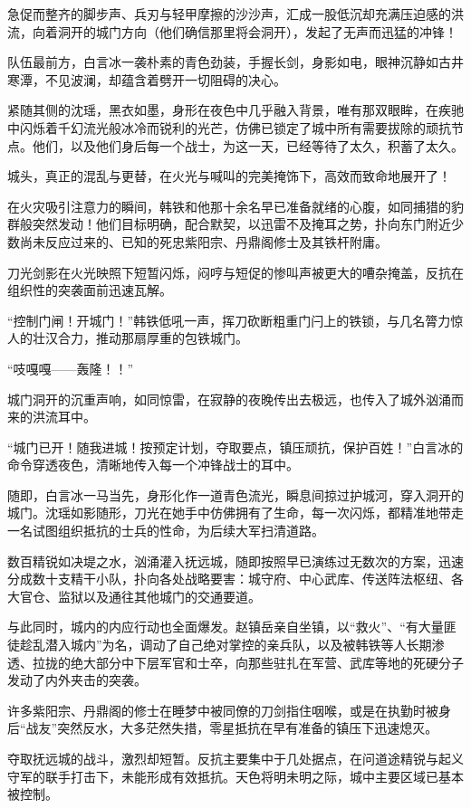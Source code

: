 急促而整齐的脚步声、兵刃与轻甲摩擦的沙沙声，汇成一股低沉却充满压迫感的洪流，向着洞开的城门方向（他们确信那里将会洞开），发起了无声而迅猛的冲锋！

队伍最前方，白言冰一袭朴素的青色劲装，手握长剑，身影如电，眼神沉静如古井寒潭，不见波澜，却蕴含着劈开一切阻碍的决心。

紧随其侧的沈瑶，黑衣如墨，身形在夜色中几乎融入背景，唯有那双眼眸，在疾驰中闪烁着千幻流光般冰冷而锐利的光芒，仿佛已锁定了城中所有需要拔除的顽抗节点。他们，以及他们身后每一个战士，为这一天，已经等待了太久，积蓄了太久。

城头，真正的混乱与更替，在火光与喊叫的完美掩饰下，高效而致命地展开了！

在火灾吸引注意力的瞬间，韩铁和他那十余名早已准备就绪的心腹，如同捕猎的豹群般突然发动！他们目标明确，配合默契，以迅雷不及掩耳之势，扑向东门附近少数尚未反应过来的、已知的死忠紫阳宗、丹鼎阁修士及其铁杆附庸。

刀光剑影在火光映照下短暂闪烁，闷哼与短促的惨叫声被更大的嘈杂掩盖，反抗在组织性的突袭面前迅速瓦解。

“控制门闸！开城门！”韩铁低吼一声，挥刀砍断粗重门闩上的铁锁，与几名膂力惊人的壮汉合力，推动那扇厚重的包铁城门。

“吱嘎嘎——轰隆！！”

城门洞开的沉重声响，如同惊雷，在寂静的夜晚传出去极远，也传入了城外汹涌而来的洪流耳中。

“城门已开！随我进城！按预定计划，夺取要点，镇压顽抗，保护百姓！”白言冰的命令穿透夜色，清晰地传入每一个冲锋战士的耳中。

随即，白言冰一马当先，身形化作一道青色流光，瞬息间掠过护城河，穿入洞开的城门。沈瑶如影随形，刀光在她手中仿佛拥有了生命，每一次闪烁，都精准地带走一名试图组织抵抗的士兵的性命，为后续大军扫清道路。

数百精锐如决堤之水，汹涌灌入抚远城，随即按照早已演练过无数次的方案，迅速分成数十支精干小队，扑向各处战略要害：城守府、中心武库、传送阵法枢纽、各大官仓、监狱以及通往其他城门的交通要道。

与此同时，城内的内应行动也全面爆发。赵镇岳亲自坐镇，以“救火”、“有大量匪徒趁乱潜入城内”为名，调动了自己绝对掌控的亲兵队，以及被韩铁等人长期渗透、拉拢的绝大部分中下层军官和士卒，向那些驻扎在军营、武库等地的死硬分子发动了内外夹击的突袭。

许多紫阳宗、丹鼎阁的修士在睡梦中被同僚的刀剑指住咽喉，或是在执勤时被身后“战友”突然反水，大多茫然失措，零星抵抗在早有准备的镇压下迅速熄灭。

夺取抚远城的战斗，激烈却短暂。反抗主要集中于几处据点，在问道途精锐与起义守军的联手打击下，未能形成有效抵抗。天色将明未明之际，城中主要区域已基本被控制。

